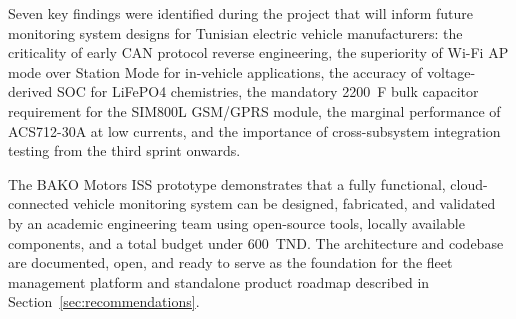 Seven key findings were identified during the project that will inform future monitoring system designs for Tunisian electric vehicle manufacturers: the criticality of early CAN protocol reverse engineering, the superiority of Wi-Fi AP mode over Station Mode for in-vehicle applications, the accuracy of voltage-derived SOC for LiFePO4 chemistries, the mandatory 2200~\textmu{}F bulk capacitor requirement for the SIM800L GSM/GPRS module, the marginal performance of ACS712-30A at low currents, and the importance of cross-subsystem integration testing from the third sprint onwards.

The BAKO Motors ISS prototype demonstrates that a fully functional, cloud-connected vehicle monitoring system can be designed, fabricated, and validated by an academic engineering team using open-source tools, locally available components, and a total budget under 600~TND. The architecture and codebase are documented, open, and ready to serve as the foundation for the fleet management platform and standalone product roadmap described in Section~\ref{sec:recommendations}.
